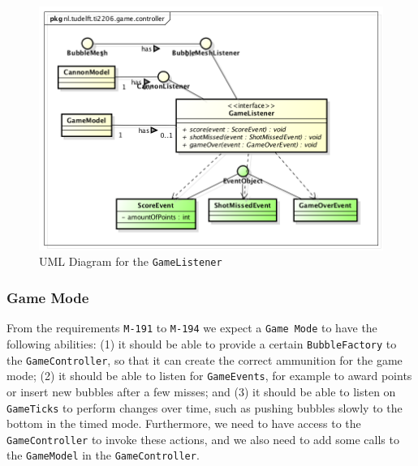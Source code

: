 \documentclass[a4paper]{article}
\begin{document}
\begin{figure}[H]
    \centering
    \includegraphics[scale=0.5]{GameListener.png}
    \caption{UML Diagram for the \texttt{GameListener}}
\end{figure}

\subsubsection{Game Mode}
\label{sec:gmmde}
From the requirements \texttt{M-191} to \texttt{M-194} we expect a \texttt{Game Mode} to have the following abilities: (1) it should be able to provide a certain \texttt{BubbleFactory} to the \texttt{GameController}, so that it can create the correct ammunition for the game mode; (2) it should be able to listen for \texttt{GameEvents}, for example to award points or insert new bubbles after a few misses; and (3) it should be able to listen on \texttt{GameTicks} to perform changes over time, such as pushing bubbles slowly to the bottom in the timed mode. Furthermore, we need to have access to the \texttt{GameController} to invoke these actions, and we also need to add some calls to the \texttt{GameModel} in the \texttt{GameController}.
\end{document}
